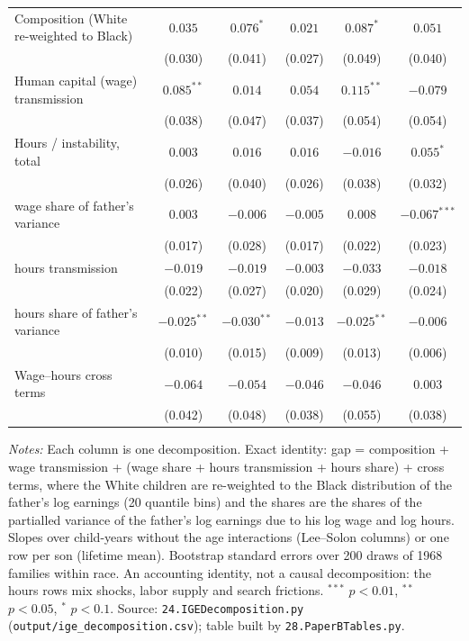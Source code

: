 \begin{table}[!htbp]
{{\begin{tabular}{lccccc}
Composition (White re-weighted to Black) & $0.035$ & $0.076^{*}$ & $0.021$ & $0.087^{*}$ & $0.051$ \\
 & (0.030) & (0.041) & (0.027) & (0.049) & (0.040) \\
Human capital (wage) transmission & $0.085^{**}$ & $0.014$ & $0.054$ & $0.115^{**}$ & $-0.079$ \\
 & (0.038) & (0.047) & (0.037) & (0.054) & (0.054) \\
Hours / instability, total & $0.003$ & $0.016$ & $0.016$ & $-0.016$ & $0.055^{*}$ \\
 & (0.026) & (0.040) & (0.026) & (0.038) & (0.032) \\
\quad wage share of father's variance & $0.003$ & $-0.006$ & $-0.005$ & $0.008$ & $-0.067^{***}$ \\
 & (0.017) & (0.028) & (0.017) & (0.022) & (0.023) \\
\quad hours transmission & $-0.019$ & $-0.019$ & $-0.003$ & $-0.033$ & $-0.018$ \\
 & (0.022) & (0.027) & (0.020) & (0.029) & (0.024) \\
\quad hours share of father's variance & $-0.025^{**}$ & $-0.030^{**}$ & $-0.013$ & $-0.025^{**}$ & $-0.006$ \\
 & (0.010) & (0.015) & (0.009) & (0.013) & (0.006) \\
Wage--hours cross terms & $-0.064$ & $-0.054$ & $-0.046$ & $-0.046$ & $0.003$ \\
 & (0.042) & (0.048) & (0.038) & (0.055) & (0.038) \\
\bottomrule
\end{tabular}}}
\par\smallskip
\begin{minipage}{\textwidth}\footnotesize \textit{Notes:} Each column is one decomposition. Exact identity: gap = composition + wage transmission + (wage share + hours transmission + hours share) + cross terms, where the White children are re-weighted to the Black distribution of the father's log earnings (20 quantile bins) and the shares are the shares of the partialled variance of the father's log earnings due to his log wage and log hours. Slopes over child-years without the age interactions (Lee--Solon columns) or one row per son (lifetime mean). Bootstrap standard errors over 200 draws of 1968 families within race. An accounting identity, not a causal decomposition: the hours rows mix shocks, labor supply and search frictions. $^{***}$ $p<0.01$, $^{**}$ $p<0.05$, $^{*}$ $p<0.1$. Source: \texttt{24.IGEDecomposition.py} (\texttt{output/ige\_decomposition.csv}); table built by \texttt{28.PaperBTables.py}.\end{minipage}
\end{table}
